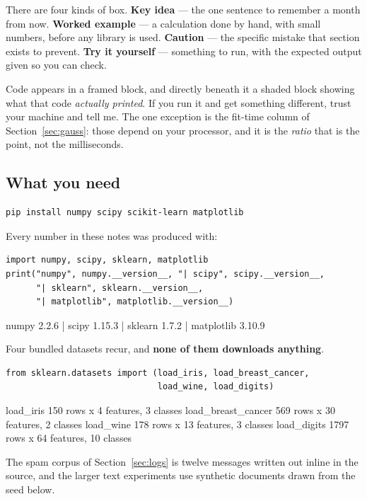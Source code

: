 \documentclass[11pt]{article}
\begin{document}
There are four kinds of box. \textbf{Key idea} --- the one sentence to
remember a month from now. \textbf{Worked example} --- a calculation done by
hand, with small numbers, before any library is used. \textbf{Caution} --- the
specific mistake that section exists to prevent. \textbf{Try it yourself} ---
something to run, with the expected output given so you can check.

Code appears in a framed block, and directly beneath it a shaded block showing
what that code \emph{actually printed}. If you run it and get something
different, trust your machine and tell me. The one exception is the fit-time
column of Section~\ref{sec:gauss}: those depend on your processor, and it is
the \emph{ratio} that is the point, not the milliseconds.

\subsection{What you need}

\begin{lstlisting}
pip install numpy scipy scikit-learn matplotlib
\end{lstlisting}

Every number in these notes was produced with:

\begin{lstlisting}
import numpy, scipy, sklearn, matplotlib
print("numpy", numpy.__version__, "| scipy", scipy.__version__,
      "| sklearn", sklearn.__version__,
      "| matplotlib", matplotlib.__version__)
\end{lstlisting}
\begin{codeout}
numpy 2.2.6 | scipy 1.15.3 | sklearn 1.7.2 | matplotlib 3.10.9
\end{codeout}

Four bundled datasets recur, and \textbf{none of them downloads anything}.

\begin{lstlisting}
from sklearn.datasets import (load_iris, load_breast_cancer,
                              load_wine, load_digits)
\end{lstlisting}
\begin{codeout}
load_iris              150 rows x   4 features, 3 classes
load_breast_cancer     569 rows x  30 features, 2 classes
load_wine              178 rows x  13 features, 3 classes
load_digits           1797 rows x  64 features, 10 classes
\end{codeout}

The spam corpus of Section~\ref{sec:logs} is twelve messages written out
inline in the source, and the larger text experiments use synthetic documents
drawn from the seed below.
\end{document}

